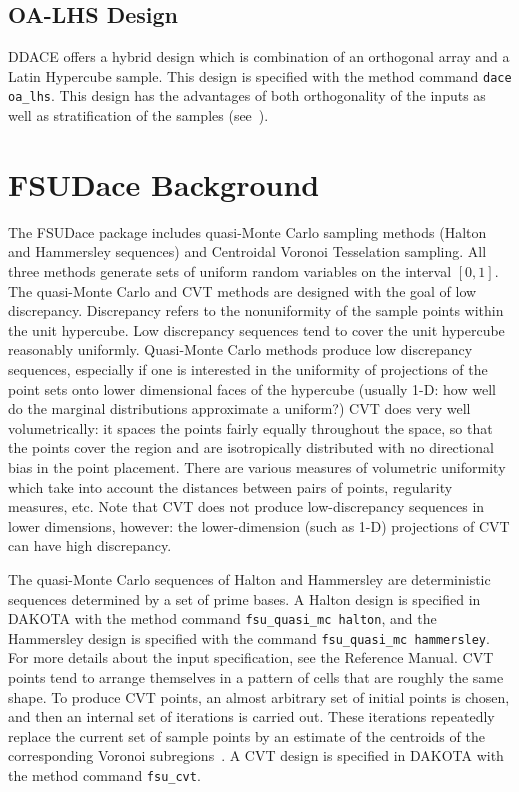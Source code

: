 \subsection{OA-LHS Design}\label{dace:oalhs}

DDACE offers a hybrid design which is combination of an orthogonal
array and a Latin Hypercube sample.  This design is specified with the
method command \texttt{dace oa\_lhs}.  This design has the advantages
of both orthogonality of the inputs as well as stratification of the
samples (see~\cite{Owe92}).

\section{FSUDace Background}\label{dace:fsudace}

The FSUDace package includes quasi-Monte Carlo sampling methods
(Halton and Hammersley sequences) and Centroidal Voronoi Tesselation
sampling.  All three methods generate sets of uniform random variables
on the interval $[0,1]$.  The quasi-Monte Carlo and CVT methods are
designed with the goal of low discrepancy. Discrepancy refers to the
nonuniformity of the sample points within the unit hypercube. Low
discrepancy sequences tend to cover the unit hypercube reasonably
uniformly. Quasi-Monte Carlo methods produce low discrepancy
sequences, especially if one is interested in the uniformity of
projections of the point sets onto lower dimensional faces of the
hypercube (usually 1-D: how well do the marginal distributions
approximate a uniform?) CVT does very well volumetrically: it spaces
the points fairly equally throughout the space, so that the points
cover the region and are isotropically distributed with no directional
bias in the point placement. There are various measures of volumetric
uniformity which take into account the distances between pairs of
points, regularity measures, etc. Note that CVT does not produce
low-discrepancy sequences in lower dimensions, however: the
lower-dimension (such as 1-D) projections of CVT can have high
discrepancy.

The quasi-Monte Carlo sequences of Halton and Hammersley are
deterministic sequences determined by a set of prime bases.
A Halton design is specified in DAKOTA with the method command 
\texttt{fsu\_quasi\_mc halton}, and the Hammersley design is 
specified with the command \texttt{fsu\_quasi\_mc hammersley}.
For more details about the input specification, see the Reference Manual.
CVT points tend to arrange themselves in a pattern
of cells that are roughly the same shape. To produce CVT
points, an almost arbitrary set of initial points is chosen, and then
an internal set of iterations is carried out. These iterations
repeatedly replace the current set of sample points by an estimate of
the centroids of the corresponding Voronoi subregions~\cite{Du99}.
A CVT design is specified in DAKOTA with the method command
\texttt{fsu\_cvt}.

